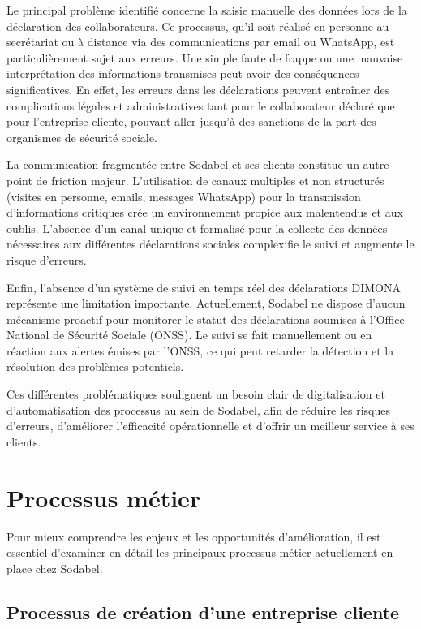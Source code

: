 Le principal problème identifié concerne la saisie manuelle des données lors de la déclaration des collaborateurs. Ce processus, qu'il soit réalisé en personne au secrétariat ou à distance via des communications par email ou WhatsApp, est particulièrement sujet aux erreurs. Une simple faute de frappe ou une mauvaise interprétation des informations transmises peut avoir des conséquences significatives. En effet, les erreurs dans les déclarations peuvent entraîner des complications légales et administratives tant pour le collaborateur déclaré que pour l'entreprise cliente, pouvant aller jusqu'à des sanctions de la part des organismes de sécurité sociale.

La communication fragmentée entre Sodabel et ses clients constitue un autre point de friction majeur. L'utilisation de canaux multiples et non structurés (visites en personne, emails, messages WhatsApp) pour la transmission d'informations critiques crée un environnement propice aux malentendus et aux oublis. L'absence d'un canal unique et formalisé pour la collecte des données nécessaires aux différentes déclarations sociales complexifie le suivi et augmente le risque d'erreurs.

Enfin, l'absence d'un système de suivi en temps réel des déclarations DIMONA représente une limitation importante. Actuellement, Sodabel ne dispose d'aucun mécanisme proactif pour monitorer le statut des déclarations soumises à l'Office National de Sécurité Sociale (ONSS). Le suivi se fait manuellement ou en réaction aux alertes émises par l'ONSS, ce qui peut retarder la détection et la résolution des problèmes potentiels.

Ces différentes problématiques soulignent un besoin clair de digitalisation et d'automatisation des processus au sein de Sodabel, afin de réduire les risques d'erreurs, d'améliorer l'efficacité opérationnelle et d'offrir un meilleur service à ses clients.

\section{Processus métier}

Pour mieux comprendre les enjeux et les opportunités d'amélioration, il est essentiel d'examiner en détail les principaux processus métier actuellement en place chez Sodabel.

\subsection{Processus de création d'une entreprise cliente}


